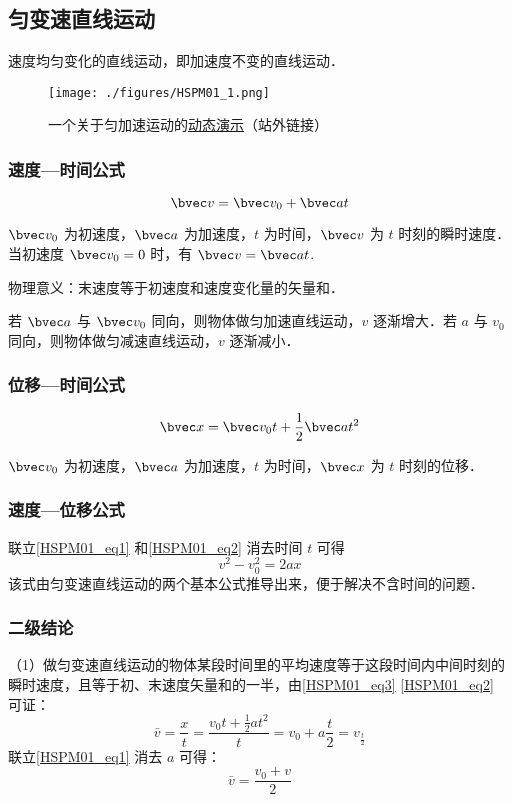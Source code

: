 \subsection{匀变速直线运动}
速度均匀变化的直线运动，即加速度不变的直线运动．
\begin{figure}[ht]
\centering
\texttt{[image: ./figures/HSPM01\_1.png]}
\caption{一个关于匀加速运动的\href{https://www.geogebra.org/m/kX9C9yDw}{动态演示}（站外链接）} \label{HSPM01_fig1}
\end{figure}
\subsubsection{速度—时间公式}
\begin{equation}\label{HSPM01_eq1}
\bvec v=\bvec v_0+\bvec a t
\end{equation}

$\bvec v_0$ 为初速度，$\bvec a$ 为加速度，$t$ 为时间，$\bvec v$ 为 $t$ 时刻的瞬时速度．当初速度 $\bvec v_0=0$ 时，有 $\bvec v=\bvec a t$.

物理意义：末速度等于初速度和速度变化量的矢量和．

若 $\bvec a$ 与 $\bvec v_0$ 同向，则物体做匀加速直线运动，$v$ 逐渐增大．若 $a$ 与 $v_0$ 同向，则物体做匀减速直线运动，$v$ 逐渐减小．

\subsubsection{位移—时间公式}
\begin{equation}\label{HSPM01_eq2}
\bvec x=\bvec v_0 t+\frac12 \bvec at^2
\end{equation}

$\bvec v_0$ 为初速度，$\bvec a$ 为加速度，$t$ 为时间，$\bvec x$ 为 $t$ 时刻的位移．

\subsubsection{速度—位移公式}
联立\autoref{HSPM01_eq1} 和\autoref{HSPM01_eq2} 消去时间 $t$ 可得
\begin{equation}\label{HSPM01_eq4}
v^2-v_0^2=2ax
\end{equation}
该式由匀变速直线运动的两个基本公式推导出来，便于解决不含时间的问题．

\subsubsection{二级结论}
（1）做匀变速直线运动的物体某段时间里的平均速度等于这段时间内中间时刻的瞬时速度，且等于初、末速度矢量和的一半，由\autoref{HSPM01_eq3} \autoref{HSPM01_eq2} 可证：
\begin{equation}
\bar v=\frac xt=\frac{v_0t+\frac 12at^2}{t}=v_0+a\frac t2=v_{\frac t2}
\end{equation}
联立\autoref{HSPM01_eq1} 消去 $a$ 可得：
\begin{equation}
\bar v=\frac{v_0+v}{2}
\end{equation}

